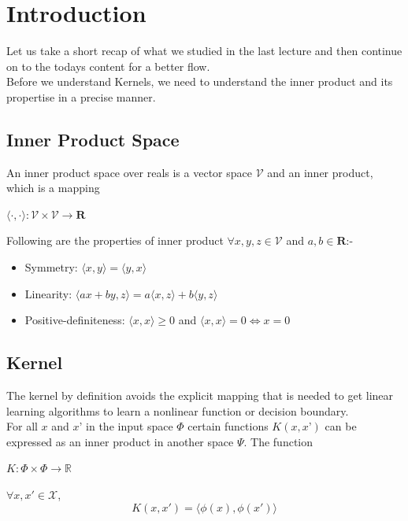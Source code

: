 \documentclass[12pt]{article}
\begin{document}
\section{Introduction}

 Let us take a short recap of what we studied in the last lecture and then continue on to the todays content for a better flow. \\
 Before we understand Kernels, we need to understand the inner product and its propertise in a precise manner.
\subsection{Inner Product Space}

An inner product space over reals is a vector space $\mathcal{V}$ and an inner product, which is a mapping
\begin{center}
    $\langle\cdot,\cdot\rangle:\mathcal{V}\times\mathcal{V}\to\mathcal{\boldsymbol{R}}$
\end{center}
Following are the properties of inner product $\forall x,y,z\in \mathcal{V}$ and $a,b \in \mathcal{\boldsymbol{R}}$:-\\
\begin{itemize}
    \item Symmetry: $\langle x,y\rangle = \langle y,x \rangle$
    \item Linearity: $\langle ax+by,z \rangle = a\langle x,z\rangle + b\langle y,z \rangle $
    \item Positive-definiteness: $\langle x,x \rangle\geq 0$ and $\langle x,x \rangle=0 \iff x=0$
\end{itemize}

\subsection{Kernel}
The kernel by definition avoids the explicit mapping that is needed to get linear learning algorithms to learn a nonlinear function or decision boundary.\\

For all $ x $ and $x’$ in the input space $ \Phi $ certain functions $ K(x,x’) $ can be expressed as an inner product in another space $ \Psi $. The function \\
\begin{center}
    $ K: \Phi  \times \Phi \rightarrow \mathbb{R}$
\end{center}
$\forall x,x' \in \mathcal{X}$, 
\[K(x,x') = \langle \phi(x), \phi(x') \rangle_{\mathcal{}}\]
\end{document}
